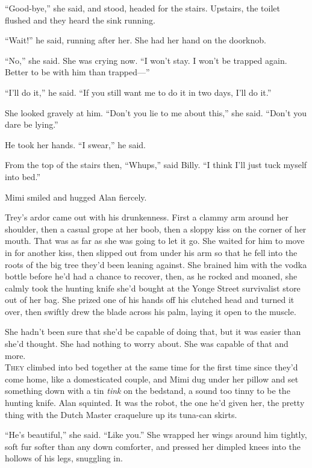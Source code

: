 \documentclass{article}
\begin{document}
``Good-bye,'' she said, and stood, headed for the stairs.  Upstairs,
the toilet flushed and they heard the sink running.

``Wait!'' he said, running after her.  She had her hand on the
doorknob.

``No,'' she said.  She was crying now.  ``I won't stay.  I won't be
trapped again.  Better to be with him than trapped---''

``I'll do it,'' he said.  ``If you still want me to do it in two days,
I'll do it.''

She looked gravely at him.  ``Don't you lie to me about this,'' she
said.  ``Don't you dare be lying.''

He took her hands.  ``I swear,'' he said.

From the top of the stairs then, ``Whups,'' said Billy.  ``I think
I'll just tuck myself into bed.''

Mimi smiled and hugged Alan fiercely.

Trey's ardor came out with his drunkenness.  First a clammy arm around
her shoulder, then a casual grope at her boob, then a sloppy kiss on
the corner of her mouth.  That was as far as she was going to let it
go.  She waited for him to move in for another kiss, then slipped out
from under his arm so that he fell into the roots of the big tree
they'd been leaning against.  She brained him with the vodka bottle
before he'd had a chance to recover, then, as he rocked and moaned,
she calmly took the hunting knife she'd bought at the Yonge Street
survivalist store out of her bag.  She prized one of his hands off his
clutched head and turned it over, then swiftly drew the blade across
his palm, laying it open to the muscle.

She hadn't been sure that she'd be capable of doing that, but it was
easier than she'd thought.  She had nothing to worry about.  She was
capable of that and more.
\\
\lettrine[lines=3, lhang=.5, nindent=0pt, findent=2pt]{T}{hey} climbed into bed together at the same time for the first time
since they'd come home, like a domesticated couple, and Mimi dug under
her pillow and set something down with a tin \textit{tink} on the
bedstand, a sound too tinny to be the hunting knife.  Alan squinted. 
It was the robot, the one he'd given her, the pretty thing with the
Dutch Master craquelure up its tuna-can skirts.

``He's beautiful,'' she said.  ``Like you.'' She wrapped her wings
around him tightly, soft fur softer than any down comforter, and
pressed her dimpled knees into the hollows of his legs, snuggling in.
\end{document}

